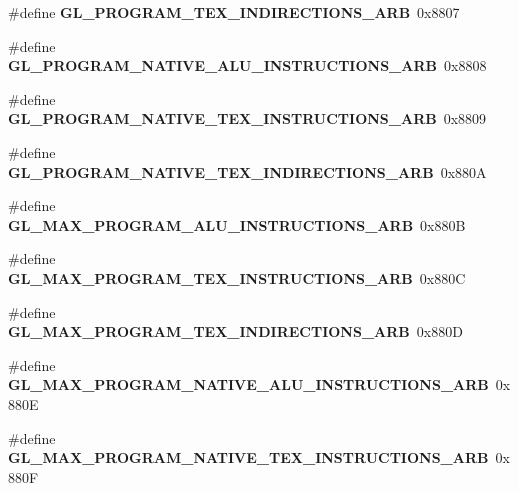 \begin{DoxyCompactItemize}
\item 
\#define {\bfseries G\+L\+\_\+\+P\+R\+O\+G\+R\+A\+M\+\_\+\+T\+E\+X\+\_\+\+I\+N\+D\+I\+R\+E\+C\+T\+I\+O\+N\+S\+\_\+\+A\+R\+B}~0x8807\label{_s_d_l__opengl_8h_a8e353235a029666f75d2c7ca8d842226}

\item 
\#define {\bfseries G\+L\+\_\+\+P\+R\+O\+G\+R\+A\+M\+\_\+\+N\+A\+T\+I\+V\+E\+\_\+\+A\+L\+U\+\_\+\+I\+N\+S\+T\+R\+U\+C\+T\+I\+O\+N\+S\+\_\+\+A\+R\+B}~0x8808\label{_s_d_l__opengl_8h_a667c1d35dd005779fb65980da6302d64}

\item 
\#define {\bfseries G\+L\+\_\+\+P\+R\+O\+G\+R\+A\+M\+\_\+\+N\+A\+T\+I\+V\+E\+\_\+\+T\+E\+X\+\_\+\+I\+N\+S\+T\+R\+U\+C\+T\+I\+O\+N\+S\+\_\+\+A\+R\+B}~0x8809\label{_s_d_l__opengl_8h_a256d1c0898a9e842a1bc472cf7963ab4}

\item 
\#define {\bfseries G\+L\+\_\+\+P\+R\+O\+G\+R\+A\+M\+\_\+\+N\+A\+T\+I\+V\+E\+\_\+\+T\+E\+X\+\_\+\+I\+N\+D\+I\+R\+E\+C\+T\+I\+O\+N\+S\+\_\+\+A\+R\+B}~0x880\+A\label{_s_d_l__opengl_8h_a2380e40c36bd8d42f1e3468eb9c4ef37}

\item 
\#define {\bfseries G\+L\+\_\+\+M\+A\+X\+\_\+\+P\+R\+O\+G\+R\+A\+M\+\_\+\+A\+L\+U\+\_\+\+I\+N\+S\+T\+R\+U\+C\+T\+I\+O\+N\+S\+\_\+\+A\+R\+B}~0x880\+B\label{_s_d_l__opengl_8h_a0a3844dfc5d6766d166fd16a83087849}

\item 
\#define {\bfseries G\+L\+\_\+\+M\+A\+X\+\_\+\+P\+R\+O\+G\+R\+A\+M\+\_\+\+T\+E\+X\+\_\+\+I\+N\+S\+T\+R\+U\+C\+T\+I\+O\+N\+S\+\_\+\+A\+R\+B}~0x880\+C\label{_s_d_l__opengl_8h_ae32ef20f92d41db853dfd36573b0da32}

\item 
\#define {\bfseries G\+L\+\_\+\+M\+A\+X\+\_\+\+P\+R\+O\+G\+R\+A\+M\+\_\+\+T\+E\+X\+\_\+\+I\+N\+D\+I\+R\+E\+C\+T\+I\+O\+N\+S\+\_\+\+A\+R\+B}~0x880\+D\label{_s_d_l__opengl_8h_a72488af52d9f9004695aef4da465afd4}

\item 
\#define {\bfseries G\+L\+\_\+\+M\+A\+X\+\_\+\+P\+R\+O\+G\+R\+A\+M\+\_\+\+N\+A\+T\+I\+V\+E\+\_\+\+A\+L\+U\+\_\+\+I\+N\+S\+T\+R\+U\+C\+T\+I\+O\+N\+S\+\_\+\+A\+R\+B}~0x880\+E\label{_s_d_l__opengl_8h_a18976e75636a5d28a5e1e2cfa3477e27}

\item 
\#define {\bfseries G\+L\+\_\+\+M\+A\+X\+\_\+\+P\+R\+O\+G\+R\+A\+M\+\_\+\+N\+A\+T\+I\+V\+E\+\_\+\+T\+E\+X\+\_\+\+I\+N\+S\+T\+R\+U\+C\+T\+I\+O\+N\+S\+\_\+\+A\+R\+B}~0x880\+F\label{_s_d_l__opengl_8h_a486c49ecd3ccd7817239b714e23d2fcb}


\end{DoxyCompactItemize}
